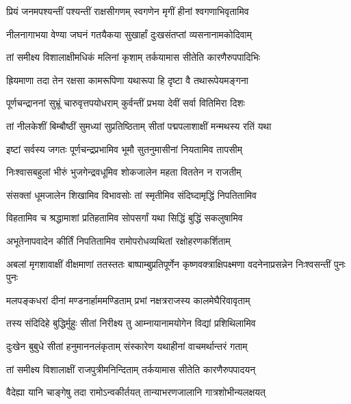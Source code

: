 \twolineshloka
{प्रियं जनमपश्यन्तीं पश्यन्तीं राक्षसीगणम्}
{स्वगणेन मृगीं हीनां श्वगणाभिवृतामिव} %

\twolineshloka
{नीलनागाभया वेण्या जघनं गतयैकया}
{सुखार्हां दुःखसंतप्तां व्यसनानामकोदिवाम्} %

\twolineshloka
{तां समीक्ष्य विशालाक्षीमधिकं मलिनां कृशाम्}
{तर्कयामास सीतेति कारणैरुपपादिभिः} %

\twolineshloka
{ह्रियमाणा तदा तेन रक्षसा कामरूपिणा}
{यथारूपा हि दृष्टा वै तथारूपेयमङ्गना} %

\twolineshloka
{पूर्णचन्द्राननां सुभ्रूं चारुवृत्तपयोधराम्}
{कुर्वन्तीं प्रभया देवीं सर्वा वितिमिरा दिशः} %

\twolineshloka
{तां नीलकेशीं बिम्बौष्ठीं सुमध्यां सुप्रतिष्ठिताम्}
{सीतां पद्मपलाशाक्षीं मन्मथस्य रतिं यथा} %

\twolineshloka
{इष्टां सर्वस्य जगतः पूर्णचन्द्रप्रभामिव}
{भूमौ सुतनुमासीनां नियतामिव तापसीम्} %

\twolineshloka
{निःश्वासबहुलां भीरुं भुजगेन्द्रवधूमिव}
{शोकजालेन महता विततेन न राजतीम्} %

\twolineshloka
{संसक्तां धूमजालेन शिखामिव विभावसोः}
{तां स्मृतीमिव संदिघ्दामृद्धिं निपतितामिव} %

\twolineshloka
{विहतामिव च श्रद्धामाशां प्रतिहतामिव}
{सोपसर्गां यथा सिद्धिं बुद्धिं सकलुषामिव} %

\twolineshloka
{अभूतेनापवादेन कीर्तिं निपतितामिव}
{रामोपरोधव्यथितां रक्षोहरणकर्शिताम्} %

\threelineshloka
{अबलां मृगशावाक्षीं वीक्षमाणां ततस्ततः}
{बाष्पाम्बुप्रतिपूर्णेन कृष्णवक्त्राक्षिपक्ष्मणा}
{वदनेनाप्रसन्नेन निःश्वसन्तीं पुनः पुनः} %

\twolineshloka
{मलपङ्कधरां दीनां मण्डनार्हाममण्डिताम्}
{प्रभां नक्षत्रराजस्य कालमेघैरिवावृताम्} %

\twolineshloka
{तस्य संदिदिहे बुद्धिर्मुहुः सीतां निरीक्ष्य तु}
{आम्नायानामयोगेन विद्यां प्रशिथिलामिव} %

\twolineshloka
{दुःखेन बुबुधे सीतां हनुमाननलंकृताम्}
{संस्कारेण यथाहीनां वाचमर्थान्तरं गताम्} %

\twolineshloka
{तां समीक्ष्य विशालाक्षीं राजपुत्रीमनिन्दिताम्}
{तर्कयामास सीतेति कारणैरुपपादयन्} %

\twolineshloka
{वैदेह्या यानि चाङ्गेषु तदा रामोऽन्वकीर्तयत्}
{तान्याभरणजालानि गात्रशोभीन्यलक्षयत्} %

